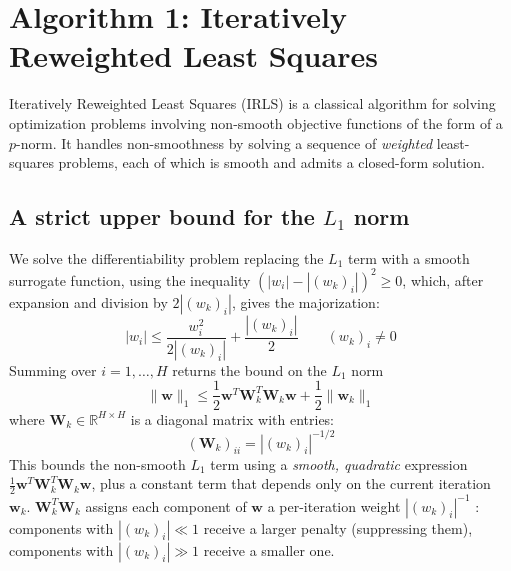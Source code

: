 \chapter{Algorithm 1: Iteratively Reweighted Least Squares}
\label{chap:irls}

Iteratively Reweighted Least Squares (IRLS) \cite{daubechies2008iterativelyreweightedsquaresminimization} is a classical algorithm for solving
optimization problems involving non-smooth objective functions of the form of a $p$-norm.
It handles non-smoothness
by solving a sequence of \textit{weighted} least-squares problems, each of which is
smooth and admits a closed-form solution.

\section{A strict upper bound for the \texorpdfstring{$L_1$}{L1} norm}
\label{sec:irls_idea}

We solve the differentiability problem replacing the $L_1$ term with a smooth surrogate function, using the inequality $(|w_i| - |(w_k)_i|)^2 \ge 0$, which, after expansion and division by $2|(w_k)_i|$, gives the majorization:
\begin{equation}
    |w_i| \le \frac{w_i^2}{2|(w_k)_i|} + \frac{|(w_k)_i|}{2} \qquad (w_k)_i \neq 0
    \label{eq:irls_majorization_inequality}
\end{equation}
Summing over $i = 1, \ldots, H$ returns the bound on the $L_1$ norm
\begin{equation}
    \|\mathbf{w}\|_1 \le \frac{1}{2} \mathbf{w}^T \mathbf{W}_k^T\mathbf{W}_k \mathbf{w} + \frac{1}{2}\|\mathbf{w}_k\|_1
    \label{eq:irls_quadratic}
\end{equation}
where $\mathbf{W}_k \in \mathbb{R}^{H \times H}$ is a diagonal matrix with entries:
\begin{equation}
    (\mathbf{W}_k)_{ii} = |(w_{k})_i|^{-1/2}
    \label{eq:irls_weights_exact}
\end{equation}
This bounds the non-smooth $L_1$ term using a \textit{smooth, quadratic} expression
$\frac{1}{2}\mathbf{w}^T \mathbf{W}_k^T \mathbf{W}_k \mathbf{w}$, plus a constant term that depends only on the current iteration $\mathbf{w}_k$.
$\mathbf{W}_k^T \mathbf{W}_k$ assigns each component of $\mathbf{w}$ a per-iteration weight $|(w_k)_i|^{-1}$ \cite{chartrand2008iteratively}: components with $|(w_k)_i| \ll 1$ receive a larger penalty (suppressing them), components with $|(w_k)_i| \gg 1$ receive a smaller one.

